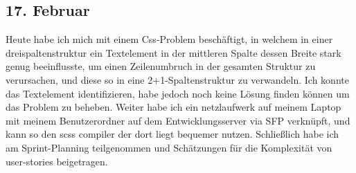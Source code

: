 \subsection{17. Februar}
Heute habe ich mich mit einem Css-Problem beschäftigt, in welchem in einer dreispaltenstruktur ein Textelement in der mittleren Spalte dessen Breite stark genug beeinflusste, um einen Zeilenumbruch in der gesamten Struktur zu verursachen, und diese so in eine 2+1-Spaltenstruktur zu verwandeln. Ich konnte das Textelement identifizieren, habe jedoch noch keine Lösung finden können um das Problem zu beheben. Weiter habe ich ein netzlaufwerk auf meinem Laptop mit meinem Benutzerordner auf dem Entwicklungsserver via SFP verknüpft, und kann so den scss compiler der dort liegt bequemer nutzen. Schließlich habe ich am Sprint-Planning teilgenommen und Schätzungen für die Komplexität von user-stories beigetragen.